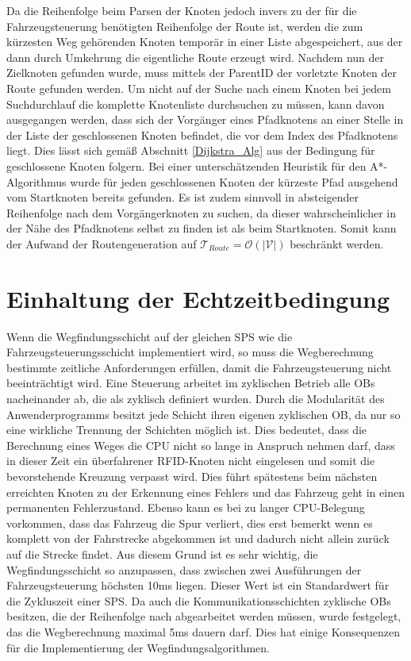 			Da die Reihenfolge beim Parsen der Knoten jedoch invers zu der für die Fahrzeugsteuerung benötigten Reihenfolge der Route ist, werden die zum kürzesten Weg gehörenden Knoten temporär in einer Liste abgespeichert, aus der dann durch Umkehrung die eigentliche Route erzeugt wird. Nachdem nun der Zielknoten gefunden wurde, muss mittels der ParentID der vorletzte Knoten der Route gefunden werden. Um nicht auf der Suche nach einem Knoten bei jedem Suchdurchlauf die komplette Knotenliste durchsuchen zu müssen, kann davon ausgegangen werden, dass sich der Vorgänger eines Pfadknotens an einer Stelle in der Liste der geschlossenen Knoten befindet, die vor dem  Index des Pfadknotens liegt. Dies lässt sich gemäß Abschnitt \ref{Dijkstra_Alg} aus der Bedingung für geschlossene Knoten folgern. Bei einer unterschätzenden Heuristik für den A*-Algorithmus wurde für jeden geschlossenen Knoten der kürzeste Pfad ausgehend vom Startknoten bereits gefunden. Es ist zudem sinnvoll in absteigender Reihenfolge nach dem Vorgängerknoten zu suchen, da dieser wahrscheinlicher in der Nähe des Pfadknotens selbst zu finden ist als beim Startknoten. Somit kann der Aufwand der Routengeneration auf $\mathcal{T}_{Route}=\mathcal{O}(\lvert \mathcal{V}\rvert)$ beschränkt werden.
			
			
	\section{Einhaltung der Echtzeitbedingung}
		\label{Echtzeitbedingung}
		Wenn die Wegfindungsschicht auf der gleichen \ac{SPS} wie die Fahrzeugsteuerungsschicht implementiert wird, so muss die Wegberechnung bestimmte zeitliche Anforderungen erfüllen, damit die Fahrzeugsteuerung nicht beeinträchtigt wird. Eine Steuerung arbeitet im zyklischen Betrieb alle \ac{OB}s nacheinander ab, die als zyklisch definiert wurden. Durch die Modularität des Anwenderprogramms besitzt jede Schicht ihren eigenen zyklischen \ac{OB}, da nur so eine wirkliche Trennung der Schichten möglich ist. Dies bedeutet, dass die Berechnung eines Weges die CPU nicht so lange in Anspruch nehmen darf, dass in dieser Zeit  ein überfahrener RFID-Knoten nicht eingelesen und somit die bevorstehende Kreuzung verpasst wird. Dies führt spätestens beim nächsten erreichten Knoten zu der Erkennung eines Fehlers und das Fahrzeug geht in einen permanenten Fehlerzustand. Ebenso kann es bei zu langer CPU-Belegung vorkommen, dass das Fahrzeug die Spur verliert, dies erst bemerkt wenn es komplett von der Fahrstrecke abgekommen ist und dadurch nicht allein zurück auf die Strecke findet. Aus diesem Grund ist es sehr wichtig, die Wegfindungsschicht so anzupassen, dass zwischen zwei Ausführungen der Fahrzeugsteuerung höchsten 10ms liegen. Dieser Wert ist ein Standardwert für die Zykluszeit einer \ac{SPS}. Da auch die Kommunikationsschichten zyklische \ac{OB}s besitzen, die der Reihenfolge nach abgearbeitet werden müssen, wurde festgelegt, das die Wegberechnung maximal 5ms dauern darf. Dies hat einige Konsequenzen für die Implementierung der Wegfindungsalgorithmen.
		

